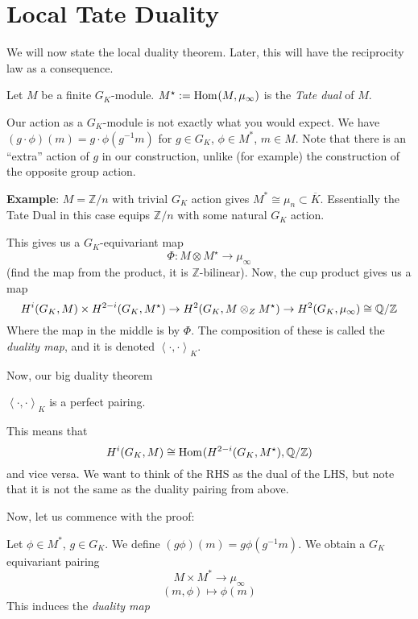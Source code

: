 \documentclass[class=article, crop=false]{standalone}
\begin{document}
\section{Local Tate Duality}

We will now state the local duality theorem. 
Later, this will have the reciprocity law as a consequence.

\begin{definition}
	Let \(M\) be a finite \(G_{K}\)-module. \(M^{\star} :=
	\operatorname{Hom}_{} (M,\mu_{\infty})\) is the \textit{Tate dual} of \(M\).
\end{definition}

Our action as a \(G_{K}\)-module is not exactly what you would expect.
We have  \((g \cdot \phi)(m) = g \cdot \phi(g^{-1} m)\) for \(g \in G_{K}\),
\(\phi \in M^{*}\), \(m \in M\).
Note that there is an ``extra'' action of \(g\) in our construction,
unlike (for example) the construction of the opposite group action.

\textbf{Example}: $M=\mathbb{Z}/n$ with trivial $G_K$ action gives $M^*\cong \mu_{n}\subset \overline{K}$. Essentially the Tate Dual in this case equips $\mathbb{Z}/n$ with some natural $G_K$ action.

This gives us a \(G_{K}\)-equivariant map  
\[
\Phi : M \otimes M^{\star} \to \mu_{\infty}
\] 
(find the map from the product, it is \(\mathbb{Z}\)-bilinear).
Now, the cup product gives us a map
\[
	H^{i}(G_{K},M) \times H^{2-i}(G_{K},M^{\star})
	\to H^{2}(G_{K}, M \otimes_{Z} M^{\star})
	\to H^{2}(G_{K}, \mu_{\infty})
	\cong \mathbb{Q} / \mathbb{Z}
\] 
Where the map in the middle is by \(\Phi\).
The composition of these is called the \textit{duality map}, and it is 
denoted \(\left<\cdot,\cdot \right>_{K}\).

Now, our big duality theorem

\begin{theorem}
	\(\left<\cdot,\cdot\right>_{K}\) is a perfect pairing.
\end{theorem}

This means that 
\[
	H^{i}(G_{K},M) \cong \operatorname{Hom}_{} (H^{2-i}(G_{K},M^{\star}),\mathbb{Q} / \mathbb{Z})
\] 
and vice versa.
We want to think of the RHS as the dual of the LHS, but note that it 
is not the same as the duality pairing from above. 

Now, let us commence with the proof: 

Let $\phi \in M^*$, $g\in G_K$. We define $(g\phi)(m)=g\phi(g^{-1}m)$. 
\vskip 5pt 
\vskip 5pt
We obtain a $G_K$ equivariant pairing
\[M\times M^* \to \mu_{\infty}\]
\[(m, \phi) \mapsto \phi(m)\]
This induces the \textit{duality map}
\end{document}
